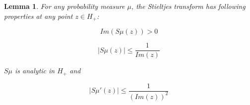 \documentclass[12pt,a4paper,leqno]{report}
\theoremstyle{plain}
\newtheorem{lem}[equation]{Lemma}
\theoremstyle{definition}
\theoremstyle{remark}
\begin{document}
\begin{lem}
For any probability measure $\mu$, the Stieltjes transform has following properties at any point $z \in H_+$:

\begin{equation}\label{prop1}
Im(S\mu(z)) > 0
\end{equation}

\begin{equation}\label{prop2}
|S\mu(z)|\leq \frac{1}{Im(z)} 
\end{equation}

$S\mu$ is analytic in $H_+$ and

\begin{equation}\label{prop3}
|S\mu'(z)| \leq \frac{1}{(Im(z))^2}
\end{equation}
\end{lem}
\end{document}
